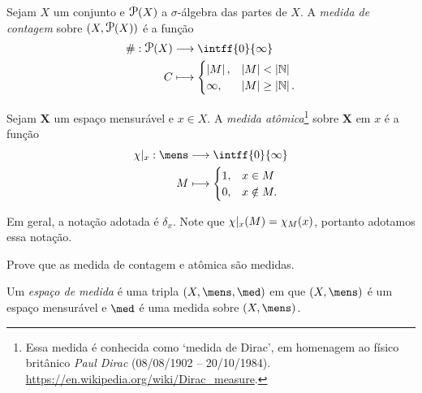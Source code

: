 \begin{defi}
Sejam $X$ um conjunto e $\p(X)$ a $\sigma$-álgebra das partes de $X$. A \emph{medida de contagem} sobre $(X,\p(X))$ é a função
	\begin{align*}
	\func{\#}{\p(X)}{\intff{0}{\infty}}{C}{
		\begin{cases}
			\card{M},& \card{M}<\card{\N} \\
			\infty,& \card{M} \geq \card{\N}.
		\end{cases}
	}
	\end{align*}
\end{defi}

\begin{defi}
Sejam $\bm X$ um espaço mensurável e $x \in X$. A \emph{medida atômica}\footnote{Essa medida é conhecida como `medida de Dirac', em homenagem ao físico britânico \textit{Paul Dirac} (08/08/1902 -- 20/10/1984). \url{https://en.wikipedia.org/wiki/Dirac_measure}.} sobre $\bm X$ em $x$ é a função
	\begin{align*}
	\func{\idc|_x}{\mens}{\intff{0}{\infty}}{M}{
		\begin{cases}
			1,& x \in M \\
			0,& x \notin M.
		\end{cases}
	}
	\end{align*}
\end{defi}

Em geral, a notação adotada é $\delta_x$. Note que $\chi|_x(M) = \chi_M(x)$, portanto adotamos essa notação.

\begin{ex}
Prove que as medida de contagem e atômica são medidas.
\end{ex}

\begin{defi}
Um \emph{espaço de medida} é uma tripla $(X,\mens,\med)$ em que $(X,\mens)$ é um espaço mensurável e $\med$ é uma medida sobre $(X,\mens)$.
\end{defi}

